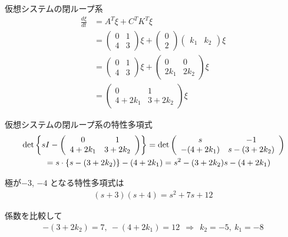 \documentclass[a4paper,11pt,fleqn]{jreport}
\def\det{\mathop{\rm det}\nolimits}
\begin{document}
仮想システムの閉ループ系
\begin{align*}
 \frac{d \xi}{dt} & = A^T \xi + C^T K^T \xi
\\
	&=
	\left (
	\begin{array}{cc}
	 0 & 1 \\
	 4 & 3
	\end{array}
	\right )
	\xi
	+
	\left (
	\begin{array}{c}
	 0 \\ 2 
	\end{array}
	\right )
	\left ( \begin{array}{cc}
		k_1 & k_2 
	\end{array} \right )
	\xi
\\
	&=
	\left (
	\begin{array}{cc}
	 0 & 1 \\
	 4 & 3
	\end{array}
	\right )
	\xi
	+
	\left (
	\begin{array}{cc}
	 0 & 0 \\ 2k_1 & 2k_2 
	\end{array}
	\right )
	\xi
\\
	&=
	\left (
	\begin{array}{cc}
	 0 & 1 \\
	 4 + 2k_1 & 3 + 2k_2
	\end{array}
	\right )
	\xi
\end{align*}

仮想システムの閉ループ系の特性多項式
\begin{align*}
	&\det
	\left \{
		sI- 
		\left ( 
		\begin{array}{cc}
		 0 & 1 \\
		 4 + 2k_1 & 3 + 2k_2
		\end{array}
		\right )
	\right \}
	=
	\det
	\left ( 
	\begin{array}{cc}
	 s & -1 \\
	 -(4 + 2k_1) & s-(3 + 2k_2)
	\end{array}
	\right )
\\
	& \hspace{1cm} =
	s \cdot \{ s-(3 + 2k_2) \} -(4 + 2k_1)
	=
	s^2 -(3 + 2k_2)s -(4 + 2k_1)
\end{align*}

極が$-3$, $-4$ となる特性多項式は
\begin{align*}
	(s+3)(s+4) = s^2+7s+12
\end{align*}

係数を比較して
\begin{align*}
	-(3 + 2k_2)=7, \ -(4 + 2k_1)=12 
	\ \ \Rightarrow \ \ 
	k_2=-5, \ k_1=-8
\end{align*}
\end{document}
